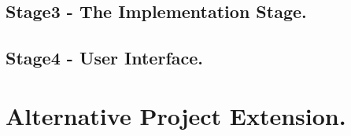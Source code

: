 \documentclass[10pt,conference]{IEEEtran}
\begin{document}
\subsection{Stage3 - The Implementation Stage. }\label{sec: 3 The Implementation Stage.}


\subsection{Stage4 -	User Interface. }\label{sec: 4. User Interface.}


\section{Alternative Project Extension.}\label{sec:2. Alternative Project Extension.}




%
%
\end{document}
